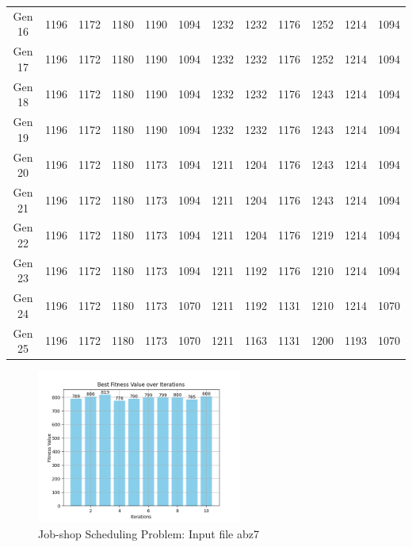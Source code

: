 \documentclass[12pt]{article}
\begin{document}
\begin{table}[h]
\begin{adjustbox}{max width=0.97\textwidth}
\begin{tabular}{*{12}{c}}
            Gen 16 & 1196 & 1172 & 1180 & 1190 & 1094 & 1232 & 1232 & 1176 & 1252 & 1214 & 1094 \\
            Gen 17 & 1196 & 1172 & 1180 & 1190 & 1094 & 1232 & 1232 & 1176 & 1252 & 1214 & 1094 \\
            Gen 18 & 1196 & 1172 & 1180 & 1190 & 1094 & 1232 & 1232 & 1176 & 1243 & 1214 & 1094 \\
            Gen 19 & 1196 & 1172 & 1180 & 1190 & 1094 & 1232 & 1232 & 1176 & 1243 & 1214 & 1094 \\
            Gen 20 & 1196 & 1172 & 1180 & 1173 & 1094 & 1211 & 1204 & 1176 & 1243 & 1214 & 1094 \\
            Gen 21 & 1196 & 1172 & 1180 & 1173 & 1094 & 1211 & 1204 & 1176 & 1243 & 1214 & 1094 \\
            Gen 22 & 1196 & 1172 & 1180 & 1173 & 1094 & 1211 & 1204 & 1176 & 1219 & 1214 & 1094 \\
            Gen 23 & 1196 & 1172 & 1180 & 1173 & 1094 & 1211 & 1192 & 1176 & 1210 & 1214 & 1094 \\
            Gen 24 & 1196 & 1172 & 1180 & 1173 & 1070 & 1211 & 1192 & 1131 & 1210 & 1214 & 1070 \\
            Gen 25 & 1196 & 1172 & 1180 & 1173 & 1070 & 1211 & 1163 & 1131 & 1200 & 1193 & 1070 \\
            \bottomrule
        \end{tabular}
    \end{adjustbox}
\end{table}


\begin{figure}[h]
    \centering
    \includegraphics[width=0.6\textwidth]{images/abz7_rntr1000-200-500-0.45-10.png}
    \caption{Job-shop Scheduling Problem: Input file abz7}
\end{figure}





\end{document}
